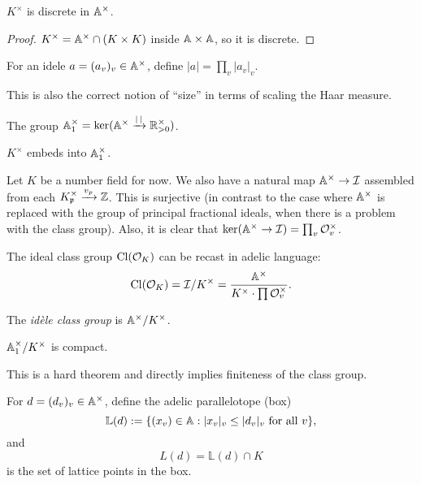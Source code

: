 \documentclass[11pt]{amsart}
\begin{document}
\begin{prop}
$K^{\times}$ is discrete in $\AA^{\times}$.
\end{prop}

\begin{proof}
$K^{\times} = \AA^{\times} \cap (K\times K)$ inside $\AA\times \AA$, so it is discrete.
\end{proof}


\begin{defn}
For an idele $a = (a_v)_v \in \AA^{\times}$, define $|a| = \prod_v |a_v|_v$.
\end{defn}

This is also the correct notion of ``size'' in terms of scaling the Haar measure.

\begin{defn}
The group $\AA_1^{\times} = \ker(\AA^{\times} \xto{|\thinspace|} \RR_{>0}^{\times})$.
\end{defn}

\begin{prop}
$K^{\times}$ embeds into $\AA^{\times}_1$.
\end{prop}


Let $K$ be a number field for now. We also have a natural map $\AA^{\times} \to \cI$ assembled from each $K_{\fp}^{\times} \xto{v_p} \ZZ$. This is surjective (in contrast to the case where $\AA^{\times}$ is replaced with the group of principal fractional ideals, when there is a problem with the class group). Also, it is clear that $\ker(\AA^{\times} \to \cI) = \prod_{v} \cO_v^{\times}$.


The ideal class group $\Cl(\cO_K)$ can be recast in adelic language:
\[\Cl(\cO_K) = \cI/K^{\times} = \frac{\AA^{\times}}{K^{\times}\cdot \prod \cO_v^{\times}}.\]

\begin{defn}
The \emph{id\`ele class group} is $\AA^{\times}/K^{\times}$.
\end{defn}

\begin{thm}
$\AA_1^{\times}/K^{\times}$ is compact.
\end{thm}

This is a hard theorem and directly implies finiteness of the class group.


\begin{defn}
For $d = (d_v)_v \in \AA^{\times}$, define the adelic parallelotope (box)
\[\mathbb{L}(d) := \{(x_v)\in \AA: |x_v|_v \le |d_v|_v \text{ for all } v\}, \]
and
\[L(d) = \mathbb{L}(d)\cap K\]
is the set of lattice points in the box.
\end{defn}
\end{document}
